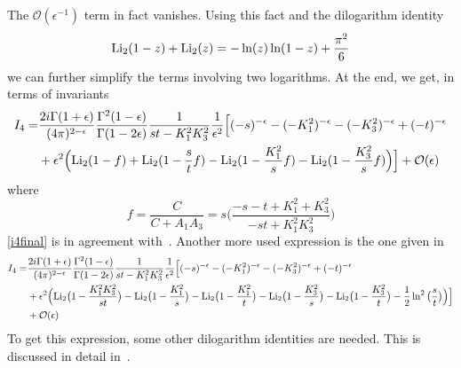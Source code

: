 The $\mathcal{O}(\epsilon^{-1})$ term in fact vanishes. 
Using this fact and the dilogarithm identity
\begin{equation*}
\mathrm{Li}_2(1-z) +\mathrm{Li}_2(z) = -\ln(z)\ln(1-z) + \frac{\pi^2}{6}
\end{equation*}
we can further simplify the terms involving two logarithms.
At the end, we get, in terms of invariants
\begin{equation}\label{i4final}
\begin{split}
I_4 = &\frac{2i\Gamma(1+\epsilon)}{(4\pi)^{2-\epsilon}}\frac{ \Gamma^2(1-\epsilon)}{\Gamma(1-2\epsilon)}\frac{1}{st-K_1^2K_3^2}\frac{1}{\epsilon^2}
\Big[
(-s)^{-\epsilon} - (-K_1^2)^{-\epsilon} - (-K_3^2)^{-\epsilon} + (-t)^{-\epsilon}
\\&
+\epsilon^2\Big(
\mathrm{Li}_2(1-f) + \mathrm{Li}_2(1-\frac{s}{t}f) - \mathrm{Li}_2(1-\frac{K_1^2}{s}f) - \mathrm{Li}_2(1-\frac{K_3^2}{s}f)
\Big)
\Big]
+\mathcal{O}(\epsilon)
\end{split}
\end{equation}
where
\begin{equation*}
f=\frac{C}{C+A_1A_3} = s\Big( \frac{-s-t + K_1^2 + K_3^2}{-st + K_1^2K_3^2}\Big)
\end{equation*}
\cref{i4final} is in agreement with~\cite{Duplancic:2000sk}. 
Another more used expression is the one given in~\cite{Bern:1993kr}
\begin{equation}\label{i4bdk}
\begin{split}
I_4 = &\frac{2i\Gamma(1+\epsilon)}{(4\pi)^{2-\epsilon}}\frac{ \Gamma^2(1-\epsilon)}{\Gamma(1-2\epsilon)}\frac{1}{st-K_1^2K_3^2}\frac{1}{\epsilon^2}
\Big[
(-s)^{-\epsilon} - (-K_1^2)^{-\epsilon} - (-K_3^2)^{-\epsilon} + (-t)^{-\epsilon}
\\&
+\epsilon^2\Big(
\mathrm{Li}_2\big(1-\frac{K_1^2K_3^2}{st}\big) 
-\mathrm{Li}_2\big(1-\frac{K_1^2}{s}\big) 
-\mathrm{Li}_2\big(1-\frac{K_1^2}{t}\big) 
-\mathrm{Li}_2\big(1-\frac{K_3^2}{s}\big) 
-\mathrm{Li}_2\big(1-\frac{K_3^2}{t}\big) 
-\frac{1}{2}\ln^2\big(\frac{s}{t}\big)
\Big)
\Big]
\\ &
+\mathcal{O}(\epsilon)
\end{split}
\end{equation}
To get this expression, some other dilogarithm identities are needed.
This is discussed in detail in~\cite{Duplancic:2000sk}.
%
%
%
\iffalse %
